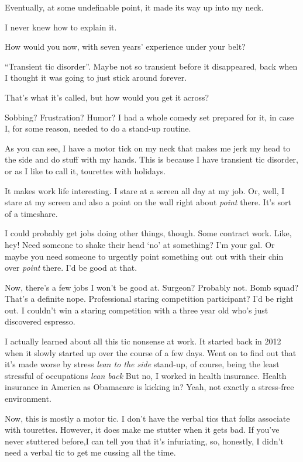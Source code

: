 Eventually, at some undefinable point, it made its way up into my neck.

I never knew how to explain it.

\begin{ally}
How would you now, with seven years' experience under your belt?
\end{ally}
``Transient tic disorder''. Maybe not so transient before it disappeared, back when I thought it was going to just stick around forever.

\begin{ally}
That's what it's called, but how would you get it across?
\end{ally}
Sobbing? Frustration? Humor? I had a whole comedy set prepared for it, in case I, for some reason, needed to do a stand-up routine.

As you can see, I have a motor tick on my neck that makes me jerk my head to the side and do stuff with my hands. This is because I have transient tic disorder, or as I like to call it, tourettes with holidays.

It makes work life interesting. I stare at a screen all day at my job. Or, well, I stare at my screen and also a point on the wall right about \emph{point} there. It's sort of a timeshare.

I could probably get jobs doing other things, though. Some contract work. Like, hey! Need someone to shake their head `no' at something? I'm your gal. Or maybe you need someone to urgently point something out out with their chin over \emph{point} there. I'd be good at that.

Now, there's a few jobs I won't be good at. Surgeon? Probably not. Bomb squad? That's a definite nope. Professional staring competition participant? I'd be right out. I couldn't win a staring competition with a three year old who's just discovered espresso.

I actually learned about all this tic nonsense at work. It started back in 2012 when it slowly started up over the course of a few days. Went on to find out that it's made worse by stress \emph{lean to the side} stand-up, of course, being the least stressful of occupations \emph{lean back} But no, I worked in health insurance. Health insurance in America as Obamacare is kicking in? Yeah, not exactly a stress-free environment.

Now, this is mostly a motor tic. I don't have the verbal tics that folks associate with tourettes. However, it does make me stutter when it gets bad. If you've never stuttered before,I can tell you that it's infuriating, so, honestly, I didn't need a verbal tic to get me cussing all the time.

